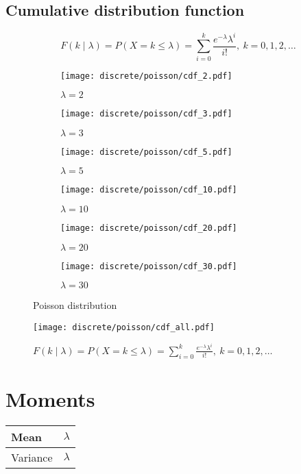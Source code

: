 \subsection{Cumulative distribution function}
\[
	F(k \mid \lambda) = P(X = k \leq \lambda) = \sum_{i = 0}^{k} \frac{e^{-\lambda} \lambda^i}{i!}, \ k = 0, 1, 2, \ldots
\]

\begin{figure}[H]
	\centering
	\begin{subfigure}[b]{0.45\textwidth}
		\texttt{[image: discrete/poisson/cdf\_2.pdf]}
		\caption{$\lambda = 2$}
	\end{subfigure}
	\begin{subfigure}[b]{0.45\textwidth}
		\texttt{[image: discrete/poisson/cdf\_3.pdf]}
		\caption{$\lambda = 3$}
	\end{subfigure}
	\begin{subfigure}[b]{0.45\textwidth}
		\texttt{[image: discrete/poisson/cdf\_5.pdf]}
		\caption{$\lambda = 5$}
	\end{subfigure}
	\begin{subfigure}[b]{0.45\textwidth}
		\texttt{[image: discrete/poisson/cdf\_10.pdf]}
		\caption{$\lambda = 10$}
	\end{subfigure}
	\begin{subfigure}[b]{0.45\textwidth}
		\texttt{[image: discrete/poisson/cdf\_20.pdf]}
		\caption{$\lambda = 20$}
	\end{subfigure}
	\begin{subfigure}[b]{0.45\textwidth}
		\texttt{[image: discrete/poisson/cdf\_30.pdf]}
		\caption{$\lambda = 30$}
	\end{subfigure}
	\caption{Poisson distribution}
\end{figure}

\begin{figure}[H]
	\texttt{[image: discrete/poisson/cdf\_all.pdf]}
	\caption{$F(k \mid \lambda) = P(X = k \leq \lambda) = \sum_{i = 0}^{k} \frac{e^{-\lambda} \lambda^i}{i!}, \ k = 0, 1, 2, \ldots$}
\end{figure}

\section{Moments}

\begin{tabularx}{\textwidth}{s X}
	\hline
	Mean & $\lambda$ \\\hline
	Variance & $\lambda$\\\hline
\end{tabularx}
